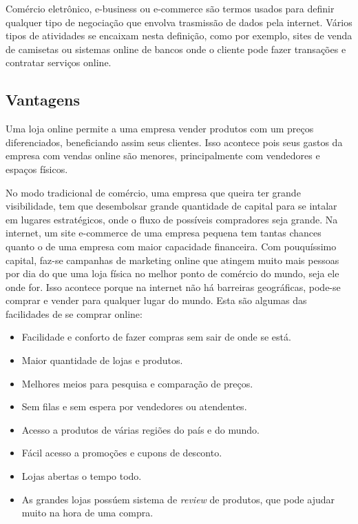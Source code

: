 Comércio eletrônico, e-business ou e-commerce são termos usados para definir qualquer tipo de negociação que envolva trasmissão de dados pela internet\cite{WhatIsEcommerce}. Vários tipos de atividades se encaixam nesta definição, como por exemplo, sites de venda de camisetas ou sistemas online de bancos onde o cliente pode fazer transações e contratar serviços online.

\subsection{Vantagens}

Uma loja online permite a uma empresa vender produtos com um preços diferenciados, beneficiando assim seus clientes. Isso acontece pois seus gastos da empresa com vendas online são menores, principalmente com vendedores e espaços físicos.

No modo tradicional de comércio, uma empresa que queira ter grande visibilidade, tem que desembolsar grande quantidade de capital para se intalar em lugares estratégicos, onde o fluxo de possíveis compradores seja grande. Na internet, um site e-commerce de uma empresa pequena tem tantas chances quanto o de uma empresa com maior capacidade financeira. Com pouquíssimo capital, faz-se campanhas de marketing online que atingem muito mais pessoas por dia do que uma loja física no melhor ponto de comércio do mundo, seja ele onde for. Isso acontece porque na internet não há barreiras geográficas, pode-se comprar e vender para qualquer lugar do mundo. Esta são algumas das facilidades de se comprar online:

\begin{itemize}
  \item Facilidade e conforto de fazer compras sem sair de onde se está.
  \item Maior quantidade de lojas e produtos.
  \item Melhores meios para pesquisa e comparação de preços.
  \item Sem filas e sem espera por vendedores ou atendentes.
  \item Acesso a produtos de várias regiões do país e do mundo.
  \item Fácil acesso a promoções e cupons de desconto.
  \item Lojas abertas o tempo todo.
  \item As grandes lojas possúem sistema de \textit{review} de produtos, que pode ajudar muito na hora de uma compra.
\end{itemize}


